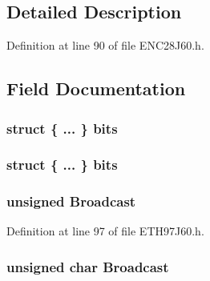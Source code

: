 \subsection{Detailed Description}


Definition at line 90 of file E\+N\+C28\+J60.\+h.



\subsection{Field Documentation}
\hypertarget{union_r_x_s_t_a_t_u_s_a3286c4aad38fca1dc99dfe9428fc04e3}{}
\subsubsection[{bits}]{\setlength{\rightskip}{0pt plus 5cm}struct \{ ... \}   bits}\label{union_r_x_s_t_a_t_u_s_a3286c4aad38fca1dc99dfe9428fc04e3}
\hypertarget{union_r_x_s_t_a_t_u_s_a8bd0d9f6832b60cd84497436b78527af}{}
\subsubsection[{bits}]{\setlength{\rightskip}{0pt plus 5cm}struct \{ ... \}   bits}\label{union_r_x_s_t_a_t_u_s_a8bd0d9f6832b60cd84497436b78527af}
\hypertarget{union_r_x_s_t_a_t_u_s_af64f6839aab7565f50ea50677c31de96}{}
\subsubsection[{Broadcast}]{\setlength{\rightskip}{0pt plus 5cm}unsigned Broadcast}\label{union_r_x_s_t_a_t_u_s_af64f6839aab7565f50ea50677c31de96}


Definition at line 97 of file E\+T\+H97\+J60.\+h.

\hypertarget{union_r_x_s_t_a_t_u_s_a1ab2c1917fd96c609563e0f962521c1f}{}
\subsubsection[{Broadcast}]{\setlength{\rightskip}{0pt plus 5cm}unsigned char Broadcast}\label{union_r_x_s_t_a_t_u_s_a1ab2c1917fd96c609563e0f962521c1f}


